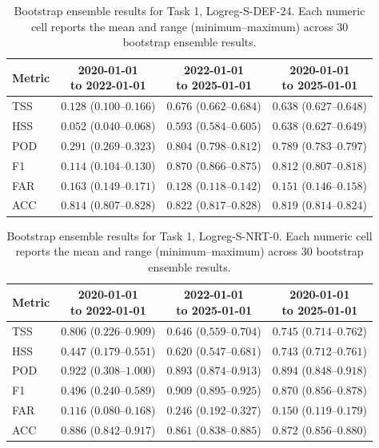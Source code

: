 \begin{table}[htbp]
\centering
\small
\caption{Bootstrap ensemble results for Task 1, Logreg-S-DEF-24. Each numeric cell reports the mean and range (minimum--maximum) across 30 bootstrap ensemble results.}
\label{tab:app-task1-logreg-s-def-24}
\begin{tabular}{lccc}
\toprule
Metric & \shortstack{2020-01-01\\to 2022-01-01} & \shortstack{2022-01-01\\to 2025-01-01} & \shortstack{2020-01-01\\to 2025-01-01} \\
\midrule
TSS & $0.128$ ($0.100$--$0.166$) & $0.676$ ($0.662$--$0.684$) & $0.638$ ($0.627$--$0.648$) \\
HSS & $0.052$ ($0.040$--$0.068$) & $0.593$ ($0.584$--$0.605$) & $0.638$ ($0.627$--$0.649$) \\
POD & $0.291$ ($0.269$--$0.323$) & $0.804$ ($0.798$--$0.812$) & $0.789$ ($0.783$--$0.797$) \\
F1 & $0.114$ ($0.104$--$0.130$) & $0.870$ ($0.866$--$0.875$) & $0.812$ ($0.807$--$0.818$) \\
FAR & $0.163$ ($0.149$--$0.171$) & $0.128$ ($0.118$--$0.142$) & $0.151$ ($0.146$--$0.158$) \\
ACC & $0.814$ ($0.807$--$0.828$) & $0.822$ ($0.817$--$0.828$) & $0.819$ ($0.814$--$0.824$) \\
\bottomrule
\end{tabular}
\end{table}
\clearpage

\begin{table}[htbp]
\centering
\small
\caption{Bootstrap ensemble results for Task 1, Logreg-S-NRT-0. Each numeric cell reports the mean and range (minimum--maximum) across 30 bootstrap ensemble results.}
\label{tab:app-task1-logreg-s-nrt-0}
\begin{tabular}{lccc}
\toprule
Metric & \shortstack{2020-01-01\\to 2022-01-01} & \shortstack{2022-01-01\\to 2025-01-01} & \shortstack{2020-01-01\\to 2025-01-01} \\
\midrule
TSS & $0.806$ ($0.226$--$0.909$) & $0.646$ ($0.559$--$0.704$) & $0.745$ ($0.714$--$0.762$) \\
HSS & $0.447$ ($0.179$--$0.551$) & $0.620$ ($0.547$--$0.681$) & $0.743$ ($0.712$--$0.761$) \\
POD & $0.922$ ($0.308$--$1.000$) & $0.893$ ($0.874$--$0.913$) & $0.894$ ($0.848$--$0.918$) \\
F1 & $0.496$ ($0.240$--$0.589$) & $0.909$ ($0.895$--$0.925$) & $0.870$ ($0.856$--$0.878$) \\
FAR & $0.116$ ($0.080$--$0.168$) & $0.246$ ($0.192$--$0.327$) & $0.150$ ($0.119$--$0.179$) \\
ACC & $0.886$ ($0.842$--$0.917$) & $0.861$ ($0.838$--$0.885$) & $0.872$ ($0.856$--$0.880$) \\
\bottomrule
\end{tabular}
\end{table}
\clearpage

